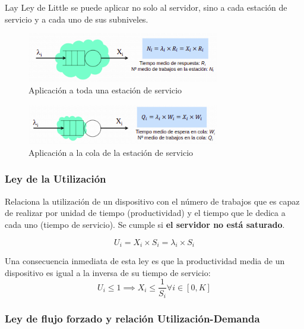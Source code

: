 \documentclass[12pt,spanish]{article}
\begin{document}
Lay Ley de Little se puede aplicar no solo al servidor, sino a cada estación de servicio y a cada uno de sus subniveles.

\begin{figure}[H]
	\centering
	\includegraphics[width=0.75\textwidth]{little1.png}
	\caption{Aplicación a toda una estación de servicio}
\end{figure}

\begin{figure}[H]
	\centering
	\includegraphics[width=0.75\textwidth]{little2.png}
	\caption{Aplicación a la cola de la estación de servicio}
\end{figure}

\subsubsection{Ley de la Utilización}

Relaciona la utilización de un dispositivo con el número de trabajos que es capaz de realizar por unidad de tiempo (productividad) y el tiempo que le dedica a cada uno (tiempo de servicio). Se cumple si \textbf{el servidor no está saturado}.

\begin{equation*}
	U_i=X_i \times S_i = \lambda_i \times S_i
\end{equation*}

Una consecuencia inmediata de esta ley es que la productividad media de un dispositivo es igual a la inversa de su tiempo de servicio:
\begin{equation*}
	U_i \leq 1 \implies X_i \leq \frac{1}{S_i} \forall i \in [0,K]
\end{equation*}

\subsubsection{Ley de flujo forzado y relación Utilización-Demanda}
\end{document}
